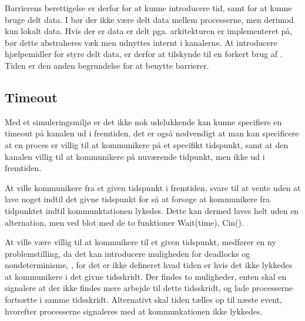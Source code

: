 
Barrierens berettigelse er derfor for at kunne introducere tid, samt for at kunne bruge delt data. I \csp bør der ikke være delt data mellem processerne, men derimod kun  lokalt data. Hvis der er data er delt pga. arkitekturen \csp er implementeret på, bør dette abstraheres væk men udnyttes internt i kanalerne. At introducere hjælpemidler for styre delt data, er derfor at tilskynde til en forkert brug af \csp. Tiden er den anden begrundelse for at benytte barrierer.


\subsection{Timeout} 
Med et simuleringsmiljø er det ikke nok
udelukkende kan kunne specifiere en timeout på kanalen ud i fremtiden,
det er også nødvendigt at man kan specificere at en proces er villig
til at kommunikere på et specifikt tidspunkt, samt at den kanalen
villig til at kommunikere på nuværende tidpunkt, men ikke ud i
fremtiden.

At ville kommunikere fra et given tidspunkt i fremtiden, svare til at   
vente uden at lave noget indtil det givne tidspunkt for så at forsøge 
at kommunikere fra tidpunktet indtil kommunktationen lykedes. Dette     
kan dermed laves helt uden en alternation, men ved blot med de to       
funktioner Wait(time), Cin().                                           

At ville være villig til at kommuikere til et given tidspunkt,         
medfører en ny problemstilling, da det kan introducere muligheden      
for deadlocks og nondeterminisme, , for det     
er ikke defineret hvad tiden er hvis det ikke lykkedes at kommunikere   
i det givne tidsskridt. Der findes to muligheder, enten skal \sched     
en signalere at der ikke findes mere arbejde til dette tidsskridt, og   
lade processerne fortsætte i samme tidsskridt. Alternativt skal tiden  
tælles op til næste event, hvorefter processerne signaleres med at    
kommunkationen ikke lykkedes.                                           


